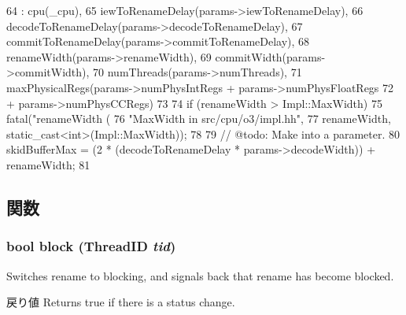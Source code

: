 \begin{DoxyCode}
64     : cpu(_cpu),
65       iewToRenameDelay(params->iewToRenameDelay),
66       decodeToRenameDelay(params->decodeToRenameDelay),
67       commitToRenameDelay(params->commitToRenameDelay),
68       renameWidth(params->renameWidth),
69       commitWidth(params->commitWidth),
70       numThreads(params->numThreads),
71       maxPhysicalRegs(params->numPhysIntRegs + params->numPhysFloatRegs
72                       + params->numPhysCCRegs)
73 {
74     if (renameWidth > Impl::MaxWidth)
75         fatal("renameWidth (%
76              "\tincrease MaxWidth in src/cpu/o3/impl.hh\n",
77              renameWidth, static_cast<int>(Impl::MaxWidth));
78 
79     // @todo: Make into a parameter.
80     skidBufferMax = (2 * (decodeToRenameDelay * params->decodeWidth)) + 
      renameWidth;
81 }
\end{DoxyCode}


\subsection{関数}
\hypertarget{classDefaultRename_ad1993925abd15d3fb59fde2ccfa3d678}{
\subsubsection[{block}]{\setlength{\rightskip}{0pt plus 5cm}bool block ({\bf ThreadID} {\em tid})}}
\label{classDefaultRename_ad1993925abd15d3fb59fde2ccfa3d678}
Switches rename to blocking, and signals back that rename has become blocked. \begin{DoxyReturn}{戻り値}
Returns true if there is a status change. 
\end{DoxyReturn}



